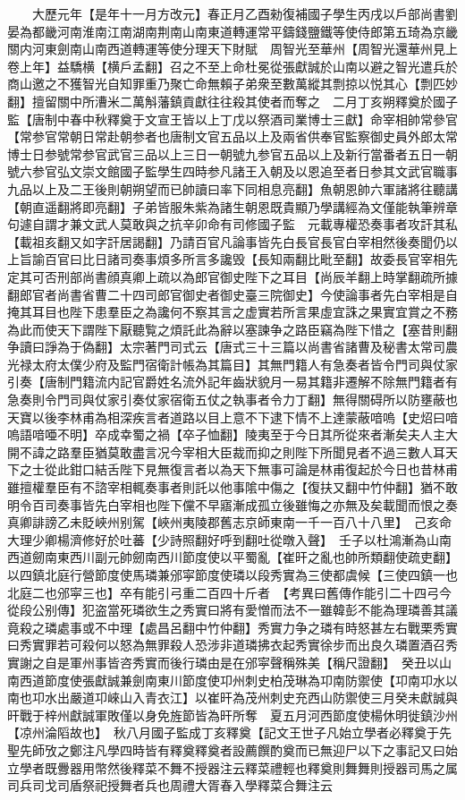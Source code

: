 　　大歷元年【是年十一月方改元】春正月乙酉勑復補國子學生丙戌以戶部尚書劉晏為都畿河南淮南江南湖南荆南山南東道轉運常平鑄錢鹽鐵等使侍郎第五琦為京畿關内河東劍南山南西道轉運等使分理天下財賦　周智光至華州【周智光還華州見上卷上年】益驕横【横戶孟翻】召之不至上命杜冕從張獻誠於山南以避之智光遣兵於商山邀之不獲智光自知罪重乃聚亡命無賴子弟衆至數萬縱其剽掠以悦其心【剽匹妙翻】擅留關中所漕米二萬斛藩鎮貢獻往往殺其使者而奪之　二月丁亥朔釋奠於國子監【唐制中春中秋釋奠于文宣王皆以上丁戊以祭酒司業博士三獻】命宰相帥常參官【常参官常朝日常赴朝参者也唐制文官五品以上及兩省供奉官監察御史員外郎太常博士日参號常参官武官三品以上三日一朝號九参官五品以上及新行當番者五日一朝號六参官弘文崇文館國子監學生四時参凡諸王入朝及以恩追至者日参其文武官職事九品以上及二王後則朝朔望而已帥讀曰率下同相息亮翻】魚朝恩帥六軍諸將往聽講【朝直遥翻將即亮翻】子弟皆服朱紫為諸生朝恩既貴顯乃學講經為文僅能執筆辨章句遽自謂才兼文武人莫敢與之抗辛卯命有司修國子監　元載專權恐奏事者攻訐其私【載祖亥翻又如字訐居謁翻】乃請百官凡論事皆先白長官長官白宰相然後奏聞仍以上旨諭百官曰比日諸司奏事煩多所言多讒毁【長知兩翻比毗至翻】故委長官宰相先定其可否刑部尚書顔真卿上疏以為郎官御史陛下之耳目【尚辰羊翻上時掌翻疏所據翻郎官者尚書省曹二十四司郎官御史者御史臺三院御史】今使論事者先白宰相是自掩其耳目也陛下患羣臣之為讒何不察其言之虚實若所言果虛宜誅之果實宜賞之不務為此而使天下謂陛下厭聽覧之煩託此為辭以塞諫争之路臣竊為陛下惜之【塞昔則翻争讀曰諍為于偽翻】太宗著門司式云【唐式三十三篇以尚書省諸曹及秘書太常司農光禄太府太僕少府及監門宿衛計帳為其篇目】其無門籍人有急奏者皆令門司與仗家引奏【唐制門籍流内記官爵姓名流外記年齒狀貌月一易其籍非遷解不除無門籍者有急奏則令門司與仗家引奏仗家宿衛五仗之執事者令力丁翻】無得關碍所以防壅蔽也天寶以後李林甫為相深疾言者道路以目上意不下逮下情不上達蒙蔽喑嗚【史炤曰喑嗚語喑唖不明】卒成幸蜀之禍【卒子恤翻】陵夷至于今日其所從來者漸矣夫人主大開不諱之路羣臣猶莫敢盡言况今宰相大臣裁而抑之則陛下所聞見者不過三數人耳天下之士從此鉗口結舌陛下見無復言者以為天下無事可論是林甫復起於今日也昔林甫雖擅權羣臣有不諮宰相輒奏事者則託以他事隂中傷之【復扶又翻中竹仲翻】猶不敢明令百司奏事皆先白宰相也陛下儻不早寤漸成孤立後雖悔之亦無及矣載聞而恨之奏真卿誹謗乙未貶峽州别駕【峽州夷陵郡舊志京師東南一千一百八十八里】　己亥命大理少卿楊濟修好於吐蕃【少詩照翻好呼到翻吐從暾入聲】　壬子以杜鴻漸為山南西道劒南東西川副元帥劒南西川節度使以平蜀亂【崔旰之亂也帥所類翻使疏吏翻】　以四鎮北庭行營節度使馬璘兼邠寜節度使璘以段秀實為三使都虞候【三使四鎮一也北庭二也邠寜三也】卒有能引弓重二百四十斤者　【考異曰舊傳作能引二十四弓今從段公别傳】犯盗當死璘欲生之秀實曰將有愛憎而法不一雖韓彭不能為理璘善其議竟殺之璘處事或不中理【處昌呂翻中竹仲翻】秀實力争之璘有時怒甚左右戰栗秀實曰秀實罪若可殺何以怒為無罪殺人恐涉非道璘拂衣起秀實徐步而出良久璘置酒召秀實謝之自是軍州事皆咨秀實而後行璘由是在邠寜聲稱殊美【稱尺證翻】　癸丑以山南西道節度使張獻誠兼劍南東川節度使卭州刺史柏茂琳為卭南防禦使【卭南卭水以南也卭水出嚴道卭崍山入青衣江】以崔旰為茂州刺史充西山防禦使三月癸未獻誠與旰戰于梓州獻誠軍敗僅以身免旌節皆為旰所奪　夏五月河西節度使楊休明徙鎮沙州【凉州淪䧟故也】　秋八月國子監成丁亥釋奠【記文王世子凡始立學者必釋奠于先聖先師攷之鄭注凡學四時皆有釋奠釋奠者設薦饌酌奠而已無迎尸以下之事記又曰始立學者既釁器用幣然後釋菜不舞不授器注云釋菜禮輕也釋奠則舞舞則授器司馬之属司兵司戈司盾祭祀授舞者兵也周禮大胥春入學釋菜合舞注云